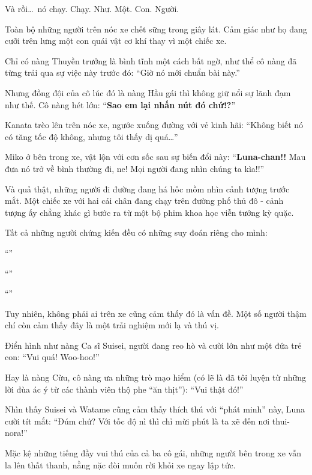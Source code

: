 \documentclass[../main.tex]{subfiles}
\begin{document}
Và rồi\dots\ nó chạy. Chạy. Như. Một. Con. Người.

Toàn bộ những người trên nóc xe chết sững trong giây lát. Cảm giác như họ đang cưỡi trên lưng một con quái vật cơ khí thay vì một chiếc xe.

Chỉ có nàng Thuyền trưởng là bình tĩnh một cách bất ngờ, như thể cô nàng đã từng trải qua sự việc này trước đó: ``Giờ nó mới chuẩn bài này.''

Nhưng đồng đội của cô lúc đó là nàng Hầu gái thì không giữ nổi sự lãnh đạm như thế. Cô nàng hét lớn: ``\textbf{Sao em lại nhấn nút đó chứ!?}''

Kanata trèo lên trên nóc xe, ngước xuống đường với vẻ kinh hãi: ``Không biết nó có tăng tốc độ không, nhưng tôi thấy dị quá\dots''

Miko ở bên trong xe, vật lộn với cơn sốc sau sự biến đổi này: ``\textbf{Luna-chan!!} Mau đưa nó trở về bình thường đi, ne! Mọi người đang nhìn chúng ta kìa!!''

Và quả thật, những người đi đường đang há hốc mồm nhìn cảnh tượng trước mắt. Một chiếc xe với hai cái chân đang chạy trên đường phố thủ đô - cảnh tượng ấy chẳng khác gì bước ra từ một bộ phim khoa học viễn tưởng kỳ quặc.

Tất cả những người chứng kiến đều có những suy đoán riêng cho mình:

``''

``''

``''

Tuy nhiên, không phải ai trên xe cũng cảm thấy đó là vấn đề. Một số người thậm chí còn cảm thấy đây là một trải nghiệm mới lạ và thú vị.

Điển hình như nàng Ca sĩ Suisei, người đang reo hò và cười lớn như một đứa trẻ con: ``Vui quá! Woo-hoo!''

Hay là nàng Cừu, cô nàng ưa những trò mạo hiểm (có lẽ là đã tôi luyện từ những lời đùa ác ý từ các thành viên thộ phe ``ăn thịt''): ``Vui thật đó!''

Nhìn thấy Suisei và Watame cũng cảm thấy thích thú với ``phát minh'' này, Luna cười tít mắt: ``Đúm chứ? Với tốc độ nì thì chỉ mừi phút là ta xẽ đến nơi thui-nora!''

Mặc kệ những tiếng đầy vui thú của cả ba cô gái, những người bên trong xe vẫn la lên thất thanh, nằng nặc đòi muốn rời khỏi xe ngay lập tức.
\end{document}
